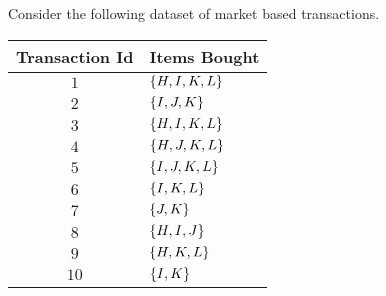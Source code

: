 



\question Consider the following dataset of market based transactions.\\
\begin{tabular}{|c|l|}
  \hline
  Transaction Id &Items Bought \\
  \hline
  $1$  &$\{H,I,K,L\}$ \\ 
  $2$  &$\{I,J,K\}$ \\ 
  $3$  &$\{H,I,K,L\}$ \\ 
  $4$  &$\{H,J,K,L\}$ \\ 
  $5$  &$\{I,J,K,L\}$ \\ 
  $6$  &$\{I,K,L\}$ \\
  $7$  &$\{J,K\}$ \\ 
  $8$  &$\{H,I,J\}$ \\ 
  $9$  &$\{H,K,L\}$ \\ 
  $10$ &$\{I,K\}$ \\ 
  \hline  
\end{tabular}
\\
\watchout

